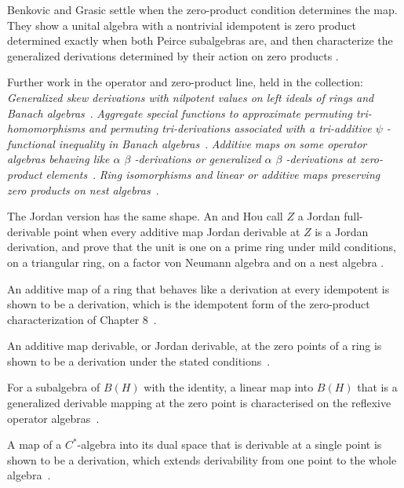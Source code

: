 Benkovic and Grasic settle when the zero-product condition determines the map.
They show a unital algebra with a nontrivial idempotent is zero product determined
exactly when both Peirce subalgebras are, and then characterize the generalized
derivations determined by their action on zero products
\cite[pp.~347--368]{BenkovicGrasic2014Generalized}.

Further work in the operator and zero-product line, held in the collection:
\noindent\emph{Generalized skew derivations with nilpotent values on left ideals of rings and Banach algebras}~\cite{LibGeneralizedSkewDerivationsWith2014}.
\noindent\emph{Aggregate special functions to approximate permuting tri-homomorphisms and permuting tri-derivations associated with a tri-additive $\psi$ -functional inequality in Banach algebras}~\cite{LibAggregateSpecialFunctionsTo2024}.
\noindent\emph{Additive maps on some operator algebras behaving like $\alpha$ $\beta$ -derivations or generalized $\alpha$ $\beta$ -derivations at zero-product elements}~\cite{LibAdditiveMapsOnSome2014}.
\noindent\emph{Ring isomorphisms and linear or additive maps preserving zero products on nest algebras}~\cite{LibRingIsomorphismsAndLinear2004}.

The Jordan version has the same shape. An and Hou call $Z$ a Jordan
full-derivable point when every additive map Jordan derivable at $Z$ is a Jordan
derivation, and prove that the unit is one on a prime ring under mild conditions,
on a triangular ring, on a factor von Neumann algebra and on a nest algebra
\cite[Abstract, p.~753]{AnHou2010JordanFullDerivable}.

An additive map of a ring that behaves like a derivation at every idempotent is shown to be a derivation, which is the idempotent form of the zero-product characterization of Chapter 8~\cite{WlAdditiveMapsOnRingsBehavingLik2011}.

An additive map derivable, or Jordan derivable, at the zero points of a ring is shown to be a derivation under the stated conditions~\cite{WlAdditiveMapsDerivableOrJordanD2010}.

For a subalgebra of $B(H)$ with the identity, a linear map into $B(H)$ that is a generalized derivable mapping at the zero point is characterised on the reflexive operator algebras~\cite{WlGeneralizedDerivableMappingsAt2019}.

A map of a $C^*$-algebra into its dual space that is derivable at a single point is shown to be a derivation, which extends derivability from one point to the whole algebra~\cite{WlDualSpaceValuedMappingsOnCAlge2019}.

